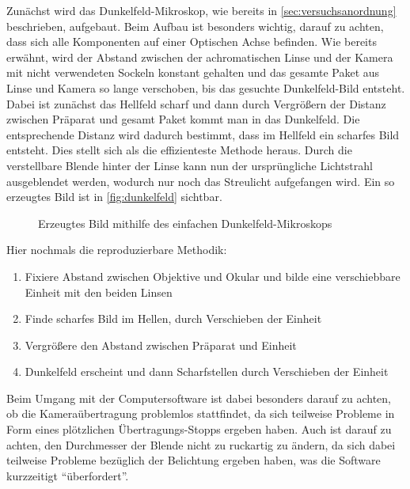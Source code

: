 \documentclass[12pt,english,ngerman]{scrartcl}
\begin{document}
Zunächst wird das Dunkelfeld-Mikroskop, wie bereits in
\autoref{sec:versuchsanordnung} beschrieben, aufgebaut. Beim Aufbau ist
besonders wichtig, darauf zu achten, dass sich alle Komponenten auf einer
Optischen Achse befinden. Wie bereits erwähnt, wird der Abstand zwischen der
achromatischen Linse und der Kamera mit nicht verwendeten Sockeln konstant
gehalten und das gesamte Paket aus Linse und Kamera so lange verschoben, bis
das gesuchte Dunkelfeld-Bild entsteht. Dabei ist zunächst das Hellfeld scharf
und dann durch Vergrößern der Distanz zwischen Präparat und gesamt Paket kommt
man in das Dunkelfeld. Die entsprechende Distanz wird dadurch bestimmt, dass im
Hellfeld ein scharfes Bild entsteht. Dies stellt sich als die effizienteste
Methode heraus. Durch die verstellbare Blende hinter der Linse kann nun der
ursprüngliche Lichtstrahl ausgeblendet werden, wodurch nur noch das Streulicht
aufgefangen wird. Ein so erzeugtes Bild ist in \autoref{fig:dunkelfeld}
sichtbar.

\begin{figure}[H]
	\begin{center}
	\end{center}
	\caption[Erzeugtes Bild mithilfe des einfachen Dunkelfeld-Mikroskops] { Erzeugtes Bild
		mithilfe des einfachen Dunkelfeld-Mikroskops
	}\label{fig:dunkelfeld}
\end{figure}

Hier nochmals die reproduzierbare Methodik:
\begin{enumerate}
	\item Fixiere Abstand zwischen Objektive und Okular und bilde eine verschiebbare
	      Einheit mit den beiden Linsen
	\item Finde scharfes Bild im Hellen, durch Verschieben der Einheit
	\item Vergrößere den Abstand zwischen Präparat und Einheit
	\item Dunkelfeld erscheint und dann Scharfstellen durch Verschieben der Einheit
\end{enumerate}

Beim Umgang mit der Computersoftware ist dabei besonders darauf zu achten, ob
die Kameraübertragung problemlos stattfindet, da sich teilweise Probleme in
Form eines plötzlichen Übertragungs-Stopps ergeben haben. Auch ist darauf zu
achten, den Durchmesser der Blende nicht zu ruckartig zu ändern, da sich dabei
teilweise Probleme bezüglich der Belichtung ergeben haben, was die Software
kurzzeitigt ``überfordert''.
\end{document}
